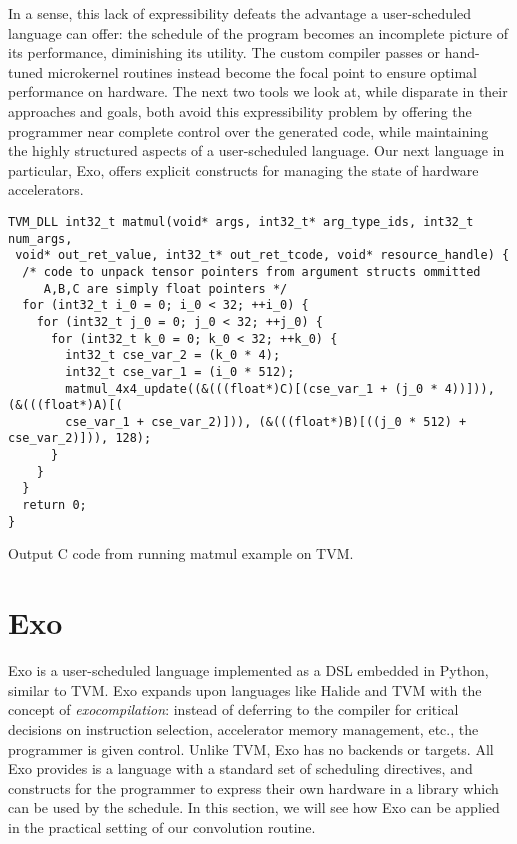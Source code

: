 \documentclass[acmsmall, nonacm=true]{acmart}
\begin{document}
In a sense, this lack of expressibility defeats the advantage a user-scheduled language can offer: the schedule of the program becomes an incomplete picture of its performance, diminishing its utility. The custom compiler passes or hand-tuned microkernel routines instead become the focal point to ensure optimal performance on hardware. The next two tools we look at, while disparate in their approaches and goals, both avoid this expressibility problem by  offering the programmer near complete control over the generated code, while maintaining the highly structured aspects of a user-scheduled language. Our next language in particular, Exo, offers explicit constructs for managing the state of hardware accelerators.








\begin{listing}
\centering
\begin{verbatim}
TVM_DLL int32_t matmul(void* args, int32_t* arg_type_ids, int32_t num_args,
 void* out_ret_value, int32_t* out_ret_tcode, void* resource_handle) {
  /* code to unpack tensor pointers from argument structs ommitted
     A,B,C are simply float pointers */
  for (int32_t i_0 = 0; i_0 < 32; ++i_0) {
    for (int32_t j_0 = 0; j_0 < 32; ++j_0) {
      for (int32_t k_0 = 0; k_0 < 32; ++k_0) {
        int32_t cse_var_2 = (k_0 * 4);
        int32_t cse_var_1 = (i_0 * 512);
        matmul_4x4_update((&(((float*)C)[(cse_var_1 + (j_0 * 4))])), (&(((float*)A)[(
        cse_var_1 + cse_var_2)])), (&(((float*)B)[((j_0 * 512) + cse_var_2)])), 128);
      }
    }
  }
  return 0;
}
\end{verbatim}
\caption{Output C code from running matmul example on TVM.}
\label{lst:tvm_output}
\end{listing}

\section{Exo}

Exo \cite{exo} is a user-scheduled language implemented as a DSL embedded in Python, similar to TVM. Exo expands upon languages like Halide and TVM with the concept of \textit{exocompilation}: instead of deferring to the compiler for critical decisions on instruction selection, accelerator memory management, etc., the programmer is given control.  Unlike TVM, Exo has no backends or targets. All Exo provides is a language with a standard set of scheduling directives, and constructs for the programmer to express their own hardware in a library which can be used by the schedule. In this section, we will see how Exo can be applied in the practical setting of our convolution routine.
\end{document}
